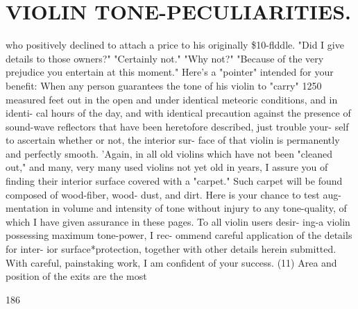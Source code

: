 \documentclass{article}
\begin{document}
\section*{VIOLIN TONE-PECULIARITIES.}
who positively declined to attach a price to his originally \$10-flddle. "Did I give details to those owners?" "Certainly not." "Why not?" "Because of the very prejudice you entertain at this moment." Here's a "pointer" intended for your benefit: When any person guarantees the tone of his violin to "carry" 1250 measured feet out in the open and under identical meteoric conditions, and in identi- cal hours of the day, and with identical precaution against the presence of sound-wave reflectors that have been heretofore described, just trouble your- self to ascertain whether or not, the interior sur- face of that violin is permanently and perfectly smooth. 'Again, in all old violins which have not been "cleaned out," and many, very many used violins not yet old in years, I assure you of finding their interior surface covered with a "carpet." Such carpet will be found composed of wood-fiber, wood- dust, and dirt. Here is your chance to test aug- mentation in volume and intensity of tone without injury to any tone-quality, of which I have given assurance in these pages. To all violin users desir- ing-a violin possessing maximum tone-power, I rec- ommend careful application of the details for inter- ior surface*protection, together with other details herein submitted. With careful, painstaking work, I am confident of your success. (11) Area and position of the exits are the most

186
\end{document}

